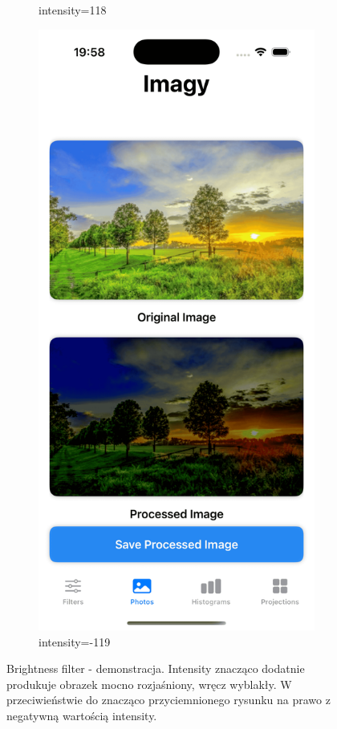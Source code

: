 \documentclass[a4paper]{article}
\begin{document}
\begin{figure}[H]
\begin{subfigure}{0.2\textwidth}
        \caption{intensity=118}
        \label{fig:trees_brightness_118}
    \end{subfigure}
    \begin{subfigure}{0.2\textwidth}
        \centering
        \includegraphics[width=\linewidth]{images/trees_brightness_m119.png}
        \caption{intensity=-119}
        \label{fig:trees_brightness_m119}
    \end{subfigure}
    \caption{Brightness filter - demonstracja. Intensity znacząco dodatnie produkuje obrazek mocno rozjaśniony, wręcz wyblakły. W przeciwieństwie do znacząco przyciemnionego rysunku na prawo z negatywną wartością intensity.}
    \label{fig:brightness}
\end{figure}
\end{document}
